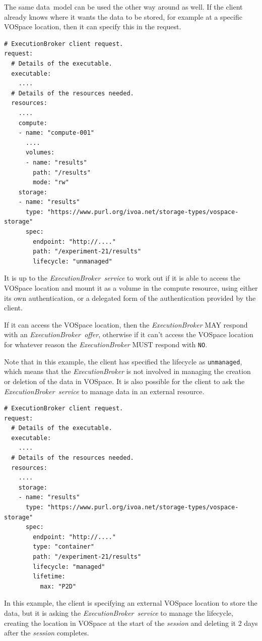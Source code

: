 \documentclass[11pt,a4paper]{ivoa}
\newcommand{\datamodel} {data~model}
\newcommand{\vospace} {VOSpace}
\newcommand{\execbrokerclass} {\textit{ExecutionBroker}}
\newcommand{\execbrokerservice}[1] {\textit{ExecutionBroker~service#1}}
\newcommand{\execoffer}[1] {\textit{ExecutionBroker~offer#1}}
\newcommand{\workerjob}[1] {\textit{session#1}}
\newcommand{\codeword}[1] {\texttt{#1}}
\begin{document}
The same \datamodel{} can be used the other way around as well.
If the client already knows where it wants the data to be stored, for example at a specific
\vospace{} location, then it can specify this in the request.




\begin{lstlisting}[]
# ExecutionBroker client request.
request:
  # Details of the executable.
  executable:
    ....
  # Details of the resources needed.
  resources:
    ....
    compute:
    - name: "compute-001"
      ....
      volumes:
      - name: "results"
        path: "/results"
        mode: "rw"
    storage:
    - name: "results"
      type: "https://www.purl.org/ivoa.net/storage-types/vospace-storage"
      spec:
        endpoint: "http://...."
        path: "/experiment-21/results"
        lifecycle: "unmanaged"
\end{lstlisting}

It is up to the \execbrokerservice{} to work out if it is able to access the
\vospace{} location and mount it as a volume in the compute resource,
using either its own authentication, or a delegated form of the authentication
provided by the client.

If it can access the \vospace{} location, then the \execbrokerclass{} MAY respond
with an \execoffer{}, otherwise if it can't access the \vospace{} location for whatever
reason the \execbrokerclass{} MUST respond with \codeword{NO}.

Note that in this example, the client has specified the lifecycle as \codeword{unmanaged},
which means that the \execbrokerclass{} is not involved in managing the creation or deletion
of the data in \vospace.
It is also possible for the client to ask the \execbrokerservice{} to manage
data in an external resource.

\begin{lstlisting}[]
# ExecutionBroker client request.
request:
  # Details of the executable.
  executable:
    ....
  # Details of the resources needed.
  resources:
    ....
    storage:
    - name: "results"
      type: "https://www.purl.org/ivoa.net/storage-types/vospace-storage"
      spec:
        endpoint: "http://...."
        type: "container"
        path: "/experiment-21/results"
        lifecycle: "managed"
        lifetime:
          max: "P2D"
\end{lstlisting}

In this example, the client is specifying an external \vospace{} location to store the data,
but it is asking the \execbrokerservice{} to manage the lifecycle, creating the location
in \vospace{} at the start of the \workerjob{} and deleting it 2 days after the \workerjob{} completes.
\end{document}
